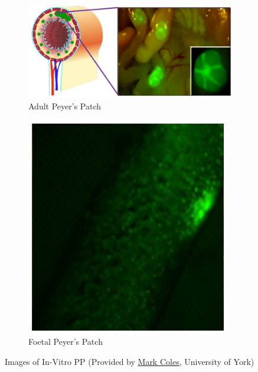 \documentclass{UoYCSproject}
\begin{document}
\begin{figure}[htp]
\begin{subfigure}{0.70\textwidth}
\centering
\includegraphics[width=\textwidth]{Appendix/Adult_PP}
\caption{Adult Peyer's Patch}
\label{fig:adult_pp}
\end{subfigure}
\begin{subfigure}{0.29\textwidth}
\centering
\includegraphics[width=\textwidth]{Appendix/Foetal_PP}
\caption{Foetal Peyer's Patch}
\label{fig:foetal_pp}
\end{subfigure}

\caption{Images of In-Vitro \gls{PP} (Provided by \href{mailto:mark.coles@york.ac.uk}{Mark Coles}, University of York)}
\label{pp_imaging}
\end{figure}
\end{document}
